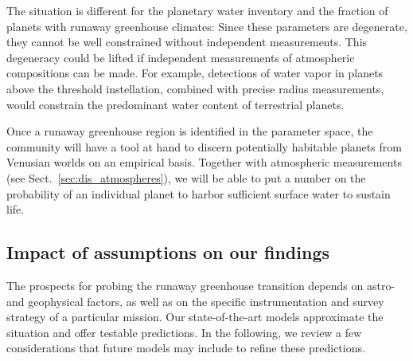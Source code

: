 \documentclass[twocolumn,twocolappendix]{aastex631}
\begin{document}
The situation is different for the planetary water inventory and the fraction of planets with runaway greenhouse climates:
Since these parameters are degenerate, they cannot be well constrained without independent measurements.
This degeneracy could be lifted if independent measurements of atmospheric compositions can be made.
For example, detections of water vapor in planets above the threshold instellation, combined with precise radius measurements, would constrain the predominant water content of terrestrial planets.

Once a runaway greenhouse region is identified in the parameter space, the community will  have a tool at hand to discern potentially habitable planets from Venusian worlds on an empirical basis.
Together with atmospheric measurements (see Sect.~\ref{sec:dis_atmospheres}), we will be able to put a number on the probability of an individual planet to harbor sufficient surface water to sustain life.


\subsection{Impact of assumptions on our findings}
The prospects for probing the runaway greenhouse transition depends on astro- and geophysical factors, as well as on the specific instrumentation and survey strategy of a particular mission.
Our state-of-the-art models approximate the situation and offer testable predictions.
In the following, we review a few considerations that future models may include to refine these predictions.
\end{document}
